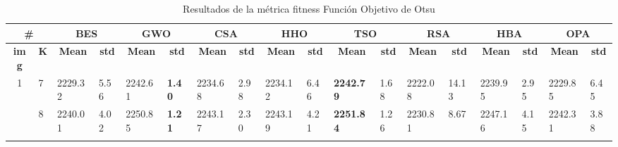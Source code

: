 \documentclass[conference]{IEEEtran}
\begin{document}
\begin{table}[]
	\caption{Resultados de la métrica fitness Función Objetivo de Otsu}
	\begin{tabular}{
			|p{0.2cm}|p{0.2cm}| %
			p{0.8cm}|p{0.4cm}| %
			p{0.8cm}|p{0.4cm}| %
			p{0.8cm}|p{0.4cm}| %
			p{0.8cm}|p{0.4cm}| %
			p{0.8cm}|p{0.4cm}| %
			p{0.8cm}|p{0.4cm}| %
			p{0.8cm}|p{0.4cm}| %
			p{0.8cm}|p{0.4cm}| %
		}
		\hline
		\multicolumn{2}{|c|}{\textbf{\#}} & \multicolumn{2}{c|}{\textbf{BES}} & \multicolumn{2}{c|}{\textbf{GWO}} & \multicolumn{2}{c|}{\textbf{CSA}} & \multicolumn{2}{c|}{\textbf{HHO}} & \multicolumn{2}{c|}{\textbf{TSO}} & \multicolumn{2}{c|}{\textbf{RSA}} & \multicolumn{2}{c|}{\textbf{HBA}} & \multicolumn{2}{c|}{\textbf{OPA}} \\ \hline
		\multicolumn{1}{|c|}{\textbf{img}} & \multicolumn{1}{c|}{\textbf{K}} & \multicolumn{1}{c|}{\textbf{Mean}} & \multicolumn{1}{c|}{\textbf{std}} & \multicolumn{1}{c|}{\textbf{Mean}} & \multicolumn{1}{c|}{\textbf{std}} & \multicolumn{1}{c|}{\textbf{Mean}} & \multicolumn{1}{c|}{\textbf{std}} & \multicolumn{1}{c|}{\textbf{Mean}} & \multicolumn{1}{c|}{\textbf{std}} & \multicolumn{1}{c|}{\textbf{Mean}} & \multicolumn{1}{c|}{\textbf{std}} & \multicolumn{1}{c|}{\textbf{Mean}} & \multicolumn{1}{c|}{\textbf{std}} & \multicolumn{1}{c|}{\textbf{Mean}} & \multicolumn{1}{c|}{\textbf{std}} & \multicolumn{1}{c|}{\textbf{Mean}} & \multicolumn{1}{c|}{\textbf{std}} \\ \hline
		\multicolumn{1}{|c|}{\multirow{3}{*}{1}} & 7 & \multicolumn{1}{l|}{2229.32} & 5.56 & \multicolumn{1}{l|}{2242.61} & \textbf{1.40} & \multicolumn{1}{l|}{2234.68} & 2.98 & \multicolumn{1}{l|}{2234.12} & 6.46 & \multicolumn{1}{l|}{\textbf{2242.79}} & 1.68 & \multicolumn{1}{l|}{2222.08} & 14.13 & \multicolumn{1}{l|}{2239.95} & 2.95 & \multicolumn{1}{l|}{2229.85} & 6.45 \\ \cline{2-18} 
		\multicolumn{1}{|c|}{} & 8 & \multicolumn{1}{l|}{2240.01} & 4.02 & \multicolumn{1}{l|}{2250.85} & \textbf{1.21} & \multicolumn{1}{l|}{2243.17} & 2.30 & \multicolumn{1}{l|}{2243.19} & 4.21 & \multicolumn{1}{l|}{\textbf{2251.84}} & 1.26 & \multicolumn{1}{l|}{2230.81} & 8.67 & \multicolumn{1}{l|}{2247.16} & 4.15 & \multicolumn{1}{l|}{2242.31} & 3.88 \\ \cline{2-18} 

\end{tabular}
\end{table}
\end{document}
